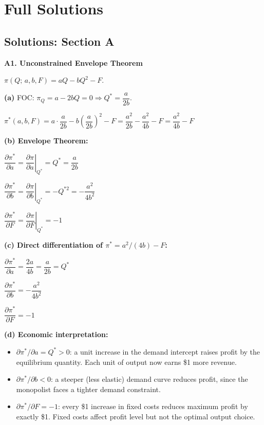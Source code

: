 \documentclass[12pt, a4paper]{article}
\theoremstyle{definition}
\newcommand{\pp}[2]{\dfrac{\partial #1}{\partial #2}}
\newcommand{\eval}[2]{\left.#1\right|_{#2}}
\begin{document}
\begin{enumerate}[label=\textbf{C\arabic*.}, leftmargin=2.5em]
\end{enumerate}

\newpage
\section{Full Solutions}

\subsection{Solutions: Section A}

\begin{solbox}
\textbf{A1. Unconstrained Envelope Theorem}

$\pi(Q;\,a,b,F) = aQ - bQ^2 - F$.

\textbf{(a)} FOC: $\pi_Q = a - 2bQ = 0 \Rightarrow Q^* = \dfrac{a}{2b}$.

$\pi^*(a,b,F) = a\cdot\dfrac{a}{2b} - b\left(\dfrac{a}{2b}\right)^2 - F
= \dfrac{a^2}{2b} - \dfrac{a^2}{4b} - F = \dfrac{a^2}{4b} - F$

\textbf{(b) Envelope Theorem:}

$\pp{\pi^*}{a} = \eval{\pp{\pi}{a}}{Q^*} = Q^* = \dfrac{a}{2b}$

$\pp{\pi^*}{b} = \eval{\pp{\pi}{b}}{Q^*} = -Q^{*2} = -\dfrac{a^2}{4b^2}$

$\pp{\pi^*}{F} = \eval{\pp{\pi}{F}}{Q^*} = -1$

\textbf{(c) Direct differentiation of $\pi^* = a^2/(4b) - F$:}

$\pp{\pi^*}{a} = \dfrac{2a}{4b} = \dfrac{a}{2b} = Q^*$ \checkmark

$\pp{\pi^*}{b} = -\dfrac{a^2}{4b^2}$ \checkmark

$\pp{\pi^*}{F} = -1$ \checkmark

\textbf{(d) Economic interpretation:}
\begin{itemize}
  \item $\partial\pi^*/\partial a = Q^* > 0$: a unit increase in the demand intercept raises profit by the equilibrium quantity. Each unit of output now earns \$1 more revenue.
  \item $\partial\pi^*/\partial b < 0$: a steeper (less elastic) demand curve reduces profit, since the monopolist faces a tighter demand constraint.
  \item $\partial\pi^*/\partial F = -1$: every \$1 increase in fixed costs reduces maximum profit by exactly \$1. Fixed costs affect profit level but not the optimal output choice.
\end{itemize}
\end{solbox}
\end{document}
